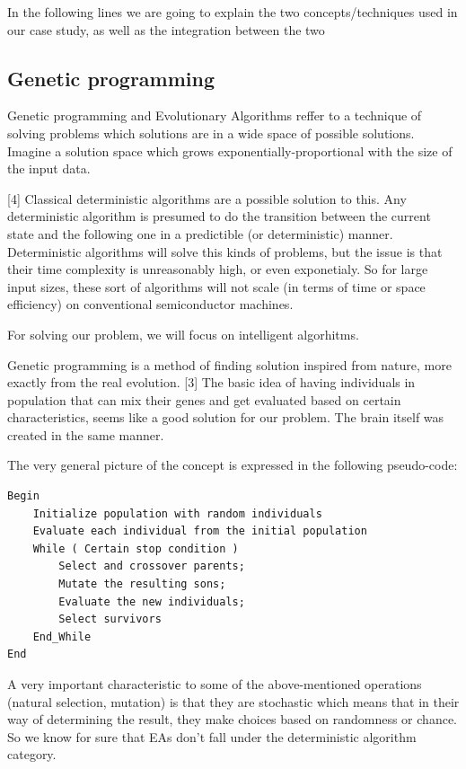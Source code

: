 \documentclass[11pt]{article}
\begin{document}
In the following lines we are going to explain the two
concepts/techniques used in our case study, as well as the integration
between the two

    \hypertarget{genetic-programming}{%
\subsection{Genetic programming}\label{genetic-programming}}

Genetic programming and Evolutionary Algorithms reffer to a technique of
solving problems which solutions are in a wide space of possible
solutions. Imagine a solution space which grows
exponentially-proportional with the size of the input data.

{[}4{]} Classical deterministic algorithms are a possible solution to
this. Any deterministic algorithm is presumed to do the transition
between the current state and the following one in a predictible (or
deterministic) manner. Deterministic algorithms will solve this kinds of
problems, but the issue is that their time complexity is unreasonably
high, or even exponetialy. So for large input sizes, these sort of
algorithms will not scale (in terms of time or space efficiency) on
conventional semiconductor machines.

For solving our problem, we will focus on intelligent algorhitms.

Genetic programming is a method of finding solution inspired from
nature, more exactly from the real evolution. {[}3{]} The basic idea of
having individuals in population that can mix their genes and get
evaluated based on certain characteristics, seems like a good solution
for our problem. The brain itself was created in the same manner.

The very general picture of the concept is expressed in the following
pseudo-code:

    \begin{verbatim}
Begin
    Initialize population with random individuals
    Evaluate each individual from the initial population
    While ( Certain stop condition )
        Select and crossover parents;
        Mutate the resulting sons;
        Evaluate the new individuals;
        Select survivors
    End_While
End
\end{verbatim}

    A very important characteristic to some of the above-mentioned
operations (natural selection, mutation) is that they are stochastic
which means that in their way of determining the result, they make
choices based on randomness or chance. So we know for sure that EAs
don't fall under the deterministic algorithm category.
\end{document}

